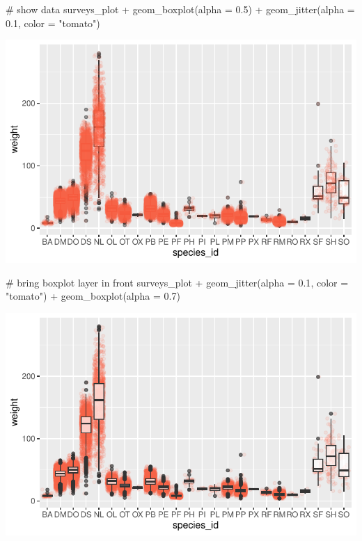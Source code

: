 \documentclass[
  letterpaper,
  DIV=11,
  numbers=noendperiod]{scrreprt}
\newenvironment{Shaded}{\begin{snugshade}}{\end{snugshade}}
\newcommand{\AttributeTok}[1]{\textcolor[rgb]{0.40,0.45,0.13}{#1}}
\newcommand{\CommentTok}[1]{\textcolor[rgb]{0.37,0.37,0.37}{#1}}
\newcommand{\FloatTok}[1]{\textcolor[rgb]{0.68,0.00,0.00}{#1}}
\newcommand{\FunctionTok}[1]{\textcolor[rgb]{0.28,0.35,0.67}{#1}}
\newcommand{\NormalTok}[1]{\textcolor[rgb]{0.00,0.23,0.31}{#1}}
\newcommand{\SpecialCharTok}[1]{\textcolor[rgb]{0.37,0.37,0.37}{#1}}
\newcommand{\StringTok}[1]{\textcolor[rgb]{0.13,0.47,0.30}{#1}}
\begin{document}
\begin{Shaded}
\begin{Highlighting}[]
\CommentTok{\# show data}
\NormalTok{surveys\_plot }\SpecialCharTok{+} \FunctionTok{geom\_boxplot}\NormalTok{(}\AttributeTok{alpha =} \FloatTok{0.5}\NormalTok{) }\SpecialCharTok{+}
  \FunctionTok{geom\_jitter}\NormalTok{(}\AttributeTok{alpha =} \FloatTok{0.1}\NormalTok{, }\AttributeTok{color =} \StringTok{"tomato"}\NormalTok{)}
\end{Highlighting}
\end{Shaded}

\includegraphics{src/notebooks/r_files/figure-pdf/unnamed-chunk-47-2.pdf}

\begin{Shaded}
\begin{Highlighting}[]
\CommentTok{\# bring boxplot layer in front}
\NormalTok{surveys\_plot }\SpecialCharTok{+} \FunctionTok{geom\_jitter}\NormalTok{(}\AttributeTok{alpha =} \FloatTok{0.1}\NormalTok{, }\AttributeTok{color =} \StringTok{"tomato"}\NormalTok{) }\SpecialCharTok{+}
  \FunctionTok{geom\_boxplot}\NormalTok{(}\AttributeTok{alpha =} \FloatTok{0.7}\NormalTok{)}
\end{Highlighting}
\end{Shaded}

\includegraphics{src/notebooks/r_files/figure-pdf/unnamed-chunk-47-3.pdf}
\end{document}
